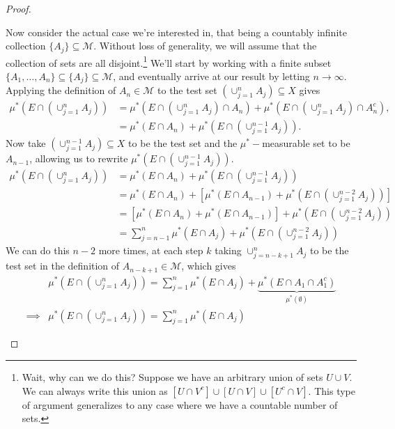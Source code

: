 \documentclass{article}
\theoremstyle{definition}
\begin{document}
\begin{proof}
\begin{enumerate}
	Now consider the actual case we're interested in, that being a countably infinite collection $\{A_j\} \subseteq\mathcal M$. Without loss of generality, we will assume that the collection of sets are all disjoint.\footnote{Wait, why can we do this? Suppose we have an arbitrary union of sets $U\cup V$. We can always write this union as $[U\cap V^c] \cup [U\cap V] \cup [U^c\cap V]$. This type of argument generalizes to any case where we have a countable number of sets.} We'll start by working with a finite subset $\{A_1,\ldots,A_n\}\subseteq \{A_j\}\subseteq\mathcal M$, and eventually arrive at our result by letting $n\to\infty$. Applying the definition of $A_n\in\mathcal M$ to the test set $(\cup_{j=1}^n A_j) \subseteq X$ gives 
	\begin{align*}
		\mu^*\left(E\cap (\cup_{j=1}^n A_j)\right)& = 	\mu^*\left(E\cap (\cup_{j=1}^n A_j) \cap A_n\right) + \mu^*\left(E\cap (\cup_{j=1}^n A_j) \cap A_n^c \right), \\
		& =\mu^*\left(E \cap A_n \right)  + \mu^*\left(E \cap (\cup_{j=1}^{n-1}A_j)\right) .
	\end{align*}
	Now take $(\cup_{j=1}^{n-1}A_j) \subseteq X$ to be the test set and the $\mu^*-$measurable set to be $A_{n-1}$, allowing us to rewrite $\mu^*\left(E \cap (\cup_{j=1}^{n-1}A_j)\right) $.
	\begin{align*}
	\mu^*\left(E\cap (\cup_{j=1}^n A_j)\right)& = \mu^*\left(E \cap A_n \right)  + \mu^*\left(E \cap (\cup_{j=1}^{n-1}A_j)\right)\\
	& = \mu^*\left(E \cap A_n \right)  + \left[ \mu^*\left(E \cap A_{n-1}\right) +  \mu^*\left(E \cap (\cup_{j=1}^{n-2}A_j)\right) \right]\\& = \left[ \mu^*\left(E \cap A_n \right)   + \mu^*\left(E \cap A_{n-1}\right)\right] +  \mu^*\left(E \cap (\cup_{j=1}^{n-2}A_j)\right)\\
	& = \sum_{j=n-1}^n\mu^*(E\cap A_j)  + \mu^*\left(E \cap (\cup_{j=1}^{n-2}A_j)\right)
	\end{align*}
	We can do this $n-2$ more times, at each step $k$ taking $\cup_{j=n-k+1}^{n}A_j$ to be the test set in the definition of $A_{n-k + 1} \in \mathcal M$, which gives 
	\begin{align}
&		\mu^*\left(E\cap (\cup_{j=1}^n A_j)\right) = \sum_{j=1}^n\mu^*(E\cap A_j) +  \underbrace{\mu^*\left(E\cap A_1 \cap A_1^c \right)}_{\mu^*(\emptyset)}\nonumber\\
		\implies &\mu^*\left(E\cap (\cup_{j=1}^n A_j)\right)  = \sum_{j=1}^n\mu^*(E\cap A_j)
	\end{align}

\end{enumerate}
\end{proof}
\end{document}
